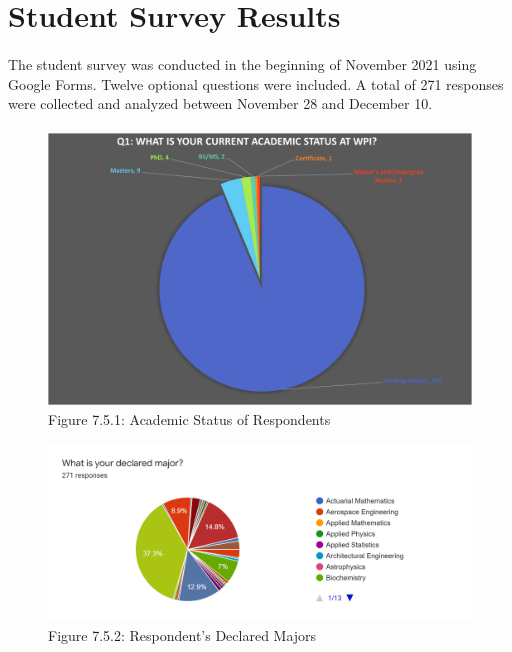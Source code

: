 \section{Student Survey Results}

\paragraph{}

The student survey was conducted in the beginning of November 2021 using Google Forms. Twelve optional questions were included. A total of 271 responses were collected and analyzed between November 28 and December 10.

\paragraph{}
 \begin{figure}[H]
        \centering
        \includegraphics[width = \textwidth, height = \textheight, keepaspectratio]{assets/img/Student Survey Results Q1.png}
        \caption*{Figure 7.5.1: Academic Status of Respondents}
    \end{figure}
    \newpage
     \begin{figure}[H]
        \hspace*{-1.75cm}
        \includegraphics[scale = .4]{assets/img/Student Survey Results Q2.png}
        \caption*{Figure 7.5.2: Respondent's Declared Majors}
    \end{figure}
